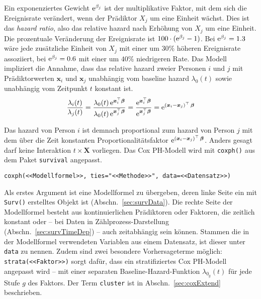 Ein exponenziertes Gewicht ${\mathrm{e}}^{\beta_{j}}$ ist der multiplikative Faktor, mit dem sich die Ereignisrate verändert, wenn der Prädiktor $X_{j}$ um eine Einheit wächst. Dies ist das \emph{hazard ratio}, also das relative hazard nach Erhöhung von $X_{j}$ um eine Einheit. Die prozentuale Veränderung der Ereignisrate ist $100 \cdot ({\mathrm{e}}^{\beta_{j}} - 1)$. Bei ${\mathrm{e}}^{\beta_{j}} = 1.3$ wäre jede zusätzliche Einheit von $X_{j}$ mit einer um $30\%$ höheren Ereignisrate assoziiert, bei ${\mathrm{e}}^{\beta_{j}} = 0.6$ mit einer um $40\%$ niedrigeren Rate. Das Modell impliziert die Annahme, dass das relative hazard zweier Personen $i$ und $j$ mit Prädiktorwerten $\bm{x}_{i}$ und $\bm{x}_{j}$ unabhängig vom baseline hazard $\lambda_{0}(t)$ sowie unabhängig vom Zeitpunkt $t$ konstant ist.
\begin{equation*}
\frac{\lambda_{i}(t)}{\lambda_{j}(t)} = \frac{\lambda_{0}(t) \, {\mathrm{e}}^{\bm{x}^{\top}_{i} \bm{\beta}}}{\lambda_{0}(t) \, {\mathrm{e}}^{\bm{x}^{\top}_{j} \bm{\beta}}} = \frac{{\mathrm{e}}^{\bm{x}^{\top}_{i} \bm{\beta}}}{{\mathrm{e}}^{\bm{x}^{\top}_{j} \bm{\beta}}} = {\mathrm{e}}^{(\bm{x}_{i} - \bm{x}_{j})^{\top} \, \bm{\beta}}
\end{equation*}

Das hazard von Person $i$ ist demnach proportional zum hazard von Person $j$ mit dem über die Zeit konstanten Proportionalitätsfaktor ${\mathrm{e}}^{(\bm{x}_{i} - \bm{x}_{j})^{\top} \, \bm{\beta}}$. Anders gesagt darf keine Interaktion $t \times \bm{X}$ vorliegen. Das Cox PH-Modell wird mit \lstinline!coxph()! aus dem Paket \lstinline!survival! angepasst.
\begin{lstlisting}
coxph(<<Modellformel>>, ties="<<Methode>>", data=<<Datensatz>>)
\end{lstlisting}

Als erstes Argument ist eine Modellformel zu übergeben, deren linke Seite ein mit \lstinline!Surv()! erstelltes Objekt ist (Abschn.\ \ref{sec:survData}). Die rechte Seite der Modellformel besteht aus kontinuierlichen Prädiktoren oder Faktoren, die zeitlich konstant oder -- bei Daten in Zählprozess-Darstellung (Abschn.\ \ref{sec:survTimeDep}) -- auch zeitabhängig sein können. Stammen die in der Modellformel verwendeten Variablen aus einem Datensatz, ist dieser unter \lstinline!data! zu nennen. Zudem sind zwei besondere Vorhersageterme möglich: \lstinline!strata(<<Faktor>>)! sorgt dafür, dass ein stratifiziertes Cox PH-Modell angepasst wird -- mit einer separaten Baseline-Hazard-Funktion $\lambda_{0_{g}}(t)$ für jede Stufe $g$ des Faktors. Der Term \lstinline!cluster! ist in Abschn.\ \ref{sec:coxExtend} beschrieben.

